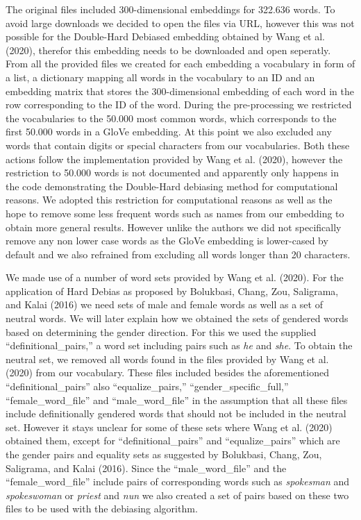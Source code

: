 \documentclass[
  english,
  man,floatsintext]{apa6}
\begin{document}
The original files included 300-dimensional embeddings for 322.636 words. To avoid large downloads we decided to open the files via URL, however this was not possible for the Double-Hard Debiased embedding obtained by Wang et al. (2020), therefor this embedding needs to be downloaded and open seperatly. From all the provided files we created for each embedding a vocabulary in form of a list, a dictionary mapping all words in the vocabulary to an ID and an embedding matrix that stores the 300-dimensional embedding of each word in the row corresponding to the ID of the word. During the pre-processing we restricted the vocabularies to the 50.000 most common words, which corresponds to the first 50.000 words in a GloVe embedding. At this point we also excluded any words that contain digits or special characters from our vocabularies. Both these actions follow the implementation provided by Wang et al. (2020), however the restriction to 50.000 words is not documented and apparently only happens in the code demonstrating the Double-Hard debiasing method for computational reasons. We adopted this restriction for computational reasons as well as the hope to remove some less frequent words such as names from our embedding to obtain more general results. However unlike the authors we did not specifically remove any non lower case words as the GloVe embedding is lower-cased by default and we also refrained from excluding all words longer than 20 characters.

We made use of a number of word sets provided by Wang et al. (2020). For the application of Hard Debias as proposed by Bolukbasi, Chang, Zou, Saligrama, and Kalai (2016) we need sets of male and female words as well as a set of neutral words. We will later explain how we obtained the sets of gendered words based on determining the gender direction. For this we used the supplied ``definitional\_pairs,'' a word set including pairs such as \emph{he} and \emph{she}. To obtain the neutral set, we removed all words found in the files provided by Wang et al. (2020) from our vocabulary. These files included besides the aforementioned ``definitional\_pairs'' also ``equalize\_pairs,'' ``gender\_specific\_full,'' ``female\_word\_file'' and ``male\_word\_file'' in the assumption that all these files include definitionally gendered words that should not be included in the neutral set. However it stays unclear for some of these sets where Wang et al. (2020) obtained them, except for ``definitional\_pairs'' and ``equalize\_pairs'' which are the gender pairs and equality sets as suggested by Bolukbasi, Chang, Zou, Saligrama, and Kalai (2016). Since the ``male\_word\_file'' and the ``female\_word\_file'' include pairs of corresponding words such as \emph{spokesman} and \emph{spokeswoman} or \emph{priest} and \emph{nun} we also created a set of pairs based on these two files to be used with the debiasing algorithm.
\end{document}
